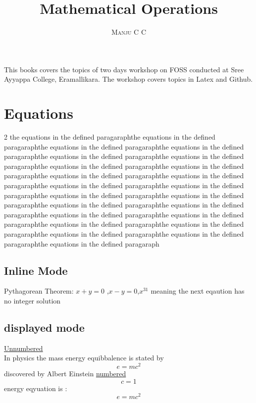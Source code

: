 \documentclass[12pt]{book}
\begin{document}
\title {\textbf {Mathematical Operations}}
\author{\textsc{Manju C C}}
\date {}
\maketitle 
This books covers the topics of two days workshop on FOSS conducted at Sree Ayyappa College, Eramallikara. The workshop covers topics in Latex and Github.
\chapter{Equations}
\begin {multicols}{2}
the equations in the defined paragaraphthe equations in the defined paragaraphthe equations in the defined paragaraphthe equations in the defined paragaraphthe equations in the defined paragaraphthe equations in the defined paragaraphthe equations in the defined paragaraphthe equations in the defined paragaraphthe equations in the defined paragaraphthe equations in the defined paragaraphthe equations in the defined paragaraphthe equations in the defined paragaraphthe equations in the defined paragaraphthe equations in the defined paragaraphthe equations in the defined paragaraphthe equations in the defined paragaraphthe equations in the defined paragaraphthe equations in the defined paragaraphthe equations in the defined paragaraphthe equations in the defined paragaraphthe equations in the defined paragaraphthe equations in the defined paragaraphthe equations in the defined paragaraph

\section{Inline Mode}
Pythagorean Theorem: $ x+y=0 $ ,\(x-y=0\),$ x^{31} $ 
meaning the next eqaution has no integer solution
\section{displayed mode}
\underline{Unnumbered}\\
In physics the mass energy equibbalence is stated by  $$e=mc^2$$ discovered by Albert Einstein
\underline{numbered}\\
\begin{displaymath}
c=1
\end{displaymath}
energy eqyuation is :
\begin{equation}
e=mc^2
\end{equation}

\end{multicols}
\end{document}
